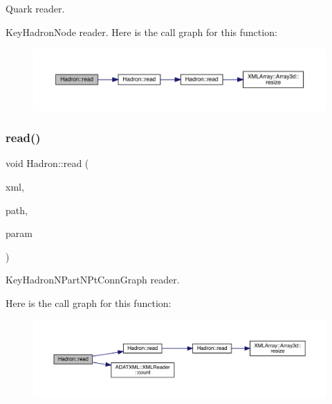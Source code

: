 Quark reader. 

Key\+Hadron\+Node reader. Here is the call graph for this function\+:
\nopagebreak
\begin{figure}[H]
\begin{center}
\leavevmode
\includegraphics[width=350pt]{d1/daf/namespaceHadron_a6eef93fdb3fe356c6326b6e8e0757ccb_cgraph}
\end{center}
\end{figure}
\mbox{\label{namespaceHadron_a3250f56af4c72ab50d162f878b999c09}} 
\subsubsection{\texorpdfstring{read()}{read()}\hspace{0.1cm}{\footnotesize\ttfamily [68/94]}}
{\footnotesize\ttfamily void Hadron\+::read (\begin{DoxyParamCaption}\item[{\mbox{\hyperlink{classADATXML_1_1XMLReader}{X\+M\+L\+Reader}} \&}]{xml,  }\item[{const std\+::string \&}]{path,  }\item[{\mbox{\hyperlink{structHadron_1_1KeyHadronNPartNPtConnGraph__t}{Key\+Hadron\+N\+Part\+N\+Pt\+Conn\+Graph\+\_\+t}} \&}]{param }\end{DoxyParamCaption})}



Key\+Hadron\+N\+Part\+N\+Pt\+Conn\+Graph reader. 

Here is the call graph for this function\+:
\nopagebreak
\begin{figure}[H]
\begin{center}
\leavevmode
\includegraphics[width=350pt]{d1/daf/namespaceHadron_a3250f56af4c72ab50d162f878b999c09_cgraph}
\end{center}
\end{figure}
\mbox{\label{namespaceHadron_a030f71bff6ae10166b42e24845e0dbf8}} 

